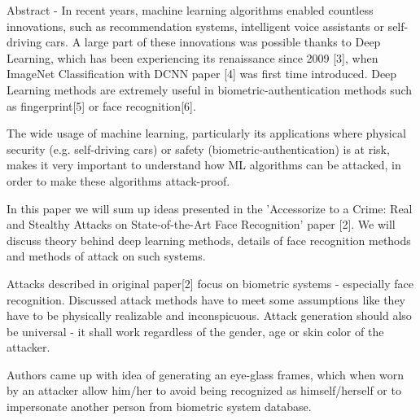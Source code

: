 Abstract - In recent years, machine learning algorithms enabled countless innovations, such  as recommendation systems, intelligent voice assistants or self-driving cars. A large part of these innovations was possible thanks to Deep Learning, which has been experiencing its renaissance since 2009 [3], when ImageNet Classification with DCNN paper [4] was first time introduced. Deep Learning methods are extremely useful in biometric-authentication methods such as fingerprint[5] or face recognition[6]. 
	
The wide usage of machine learning, particularly its applications
where physical security (e.g. self-driving cars) or safety (biometric-authentication) is at risk, makes it very important to understand how ML algorithms can be attacked, in order to make these algorithms attack-proof. 

In this paper we will sum up ideas presented in the 'Accessorize to a Crime: Real and Stealthy Attacks on State-of-the-Art Face Recognition' paper [2]. We will discuss theory behind deep learning methods, details of face recognition methods and methods of attack on such systems.

Attacks described in original paper[2] focus on biometric systems - especially face recognition. Discussed attack methods have to meet some assumptions like they have to be physically realizable and inconspicuous. Attack generation should also be universal - it shall work regardless of the gender, age or skin color of the attacker.

Authors came up with idea of generating an eye-glass frames, which when worn by an attacker allow him/her to avoid being recognized as himself/herself or to impersonate another person from biometric system database.